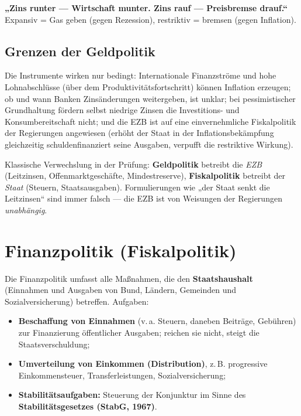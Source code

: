 \documentclass[11pt, a4paper]{article}
\begin{document}
\begin{eselsbruecke}
\textbf{„Zins runter --- Wirtschaft munter. Zins rauf --- Preisbremse drauf.``}
Expansiv = Gas geben (gegen Rezession), restriktiv = bremsen (gegen Inflation).
\end{eselsbruecke}

\subsection{Grenzen der Geldpolitik}

Die Instrumente wirken nur bedingt: Internationale Finanzströme und hohe Lohnabschlüsse
(über dem Produktivitätsfortschritt) können Inflation erzeugen; ob und wann Banken
Zinsänderungen weitergeben, ist unklar; bei pessimistischer Grundhaltung fördern selbst
niedrige Zinsen die Investitions- und Konsumbereitschaft nicht; und die EZB ist auf eine
einvernehmliche Fiskalpolitik der Regierungen angewiesen (erhöht der Staat in der
Inflationsbekämpfung gleichzeitig schuldenfinanziert seine Ausgaben, verpufft die
restriktive Wirkung).

\begin{achtung}
Klassische Verwechslung in der Prüfung: \textbf{Geldpolitik} betreibt die \emph{EZB}
(Leitzinsen, Offenmarktgeschäfte, Mindestreserve), \textbf{Fiskalpolitik} betreibt der
\emph{Staat} (Steuern, Staatsausgaben). Formulierungen wie „der Staat senkt die
Leitzinsen`` sind immer falsch --- die EZB ist von Weisungen der Regierungen
\emph{unabhängig}.
\end{achtung}

\section{Finanzpolitik (Fiskalpolitik)}

Die Finanzpolitik umfasst alle Maßnahmen, die den \textbf{Staatshaushalt} (Einnahmen und
Ausgaben von Bund, Ländern, Gemeinden und Sozialversicherung) betreffen. Aufgaben:

\begin{itemize}
  \item \textbf{Beschaffung von Einnahmen} (v.\,a. Steuern, daneben Beiträge, Gebühren) zur
    Finanzierung öffentlicher Ausgaben; reichen sie nicht, steigt die Staatsverschuldung;
  \item \textbf{Umverteilung von Einkommen (Distribution)}, z.\,B. progressive
    Einkommensteuer, Transferleistungen, Sozialversicherung;
  \item \textbf{Stabilitätsaufgaben:} Steuerung der Konjunktur im Sinne des
    \textbf{Stabilitätsgesetzes (StabG, 1967)}.
\end{itemize}
\end{document}
